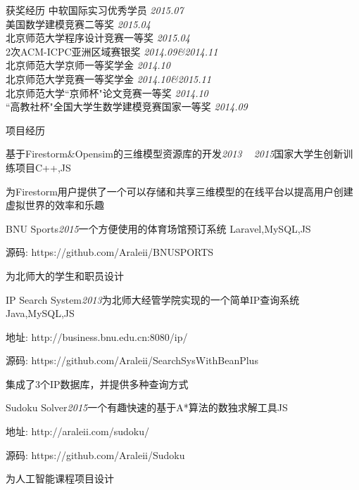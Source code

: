 \documentclass[UTF8]{resume} %
\begin{document}
\begin{rSection}{获奖经历}
{中软国际实习优秀学员} \hfill {\em 2015.07}\\
{美国数学建模竞赛二等奖} \hfill {\em 2015.04} \\ 
{北京师范大学程序设计竞赛一等奖} \hfill {\em 2015.04} \\ 
{2次ACM-ICPC亚洲区域赛银奖} \hfill {\em 2014.09\&2014.11} \\
{北京师范大学京师一等奖学金} \hfill {\em 2014.10} \\
{北京师范大学竞赛一等奖学金} \hfill {\em 2014.10\&2015.11} \\
{北京师范大学``京师杯"论文竞赛一等奖} \hfill {\em 2014.10} \\
{``高教社杯"全国大学生数学建模竞赛国家一等奖} \hfill {\em 2014.09}
\end{rSection}

\begin{rSection}{项目经历}
\begin{rSubsection}{基于Firestorm\&Opensim的三维模型资源库的开发}{ {\em 2013 ~ 2015}}{国家大学生创新训练项目}{C++,JS}
	\item 为Firestorm用户提供了一个可以存储和共享三维模型的在线平台以提高用户创建虚拟世界的效率和乐趣
\end{rSubsection}	
\begin{rSubsection}{BNU Sports}{ {\em 2015}}{一个方便使用的体育场馆预订系统 }{Laravel,MySQL,JS}
	\item 源码: https://github.com/Araleii/BNUSPORTS
	\item 为北师大的学生和职员设计
\end{rSubsection}
\begin{rSubsection}{IP Search System}{ {\em 2013}}{为北师大经管学院实现的一个简单IP查询系统}{Java,MySQL,JS}
	\item 地址: http://business.bnu.edu.cn:8080/ip/
	\item 源码: https://github.com/Araleii/SearchSysWithBeanPlus
	\item 集成了3个IP数据库，并提供多种查询方式
\end{rSubsection}		
\begin{rSubsection}{Sudoku Solver}{ {\em 2015}}{一个有趣快速的基于A*算法的数独求解工具}{JS}
	\item 地址: http://araleii.com/sudoku/
	\item 源码: https://github.com/Araleii/Sudoku
	\item 为人工智能课程项目设计 
\end{rSubsection}	
\end{rSection}
\end{document}
